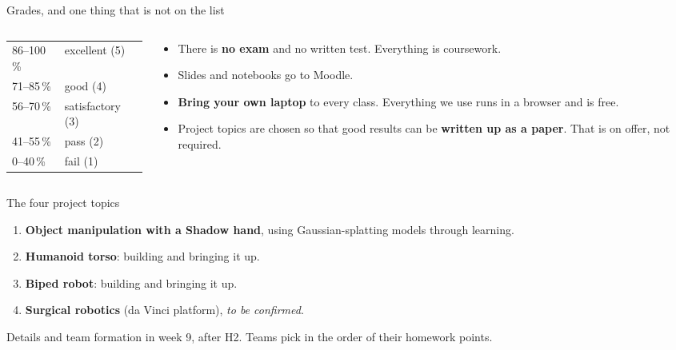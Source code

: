\documentclass[aspectratio=169]{beamer}
\begin{document}
\begin{frame}{Grades, and one thing that is not on the list}
	\begin{columns}[T]
		\begin{column}{0.36\textwidth}
			\centering \small
			\begin{tabular}{ll}
				\toprule
				86--100\,\% & excellent (5) \\
				71--85\,\% & good (4) \\
				56--70\,\% & satisfactory (3) \\
				41--55\,\% & pass (2) \\
				0--40\,\% & fail (1) \\
				\bottomrule
			\end{tabular}
		\end{column}
		\begin{column}{0.6\textwidth}
			\begin{itemize}\footnotesize
				\item There is \textbf{no exam} and no written test. Everything is coursework.
				\item Slides and notebooks go to Moodle.
				\item \textbf{Bring your own laptop} to every class. Everything we use runs in a browser and is free.
				\item Project topics are chosen so that good results can be \textbf{written up as a paper}. That is on offer, not required.
			\end{itemize}
		\end{column}
	\end{columns}
\end{frame}

\begin{frame}{The four project topics}
	\begin{enumerate}
		\item \textbf{Object manipulation with a Shadow hand}, using Gaussian-splatting models through learning.
		\item \textbf{Humanoid torso}: building and bringing it up.
		\item \textbf{Biped robot}: building and bringing it up.
		\item \textbf{Surgical robotics} (da Vinci platform), \emph{to be confirmed}.
	\end{enumerate}
	\vspace{4mm}
	Details and team formation in week 9, after H2. Teams pick in the order of their homework points.
\end{frame}
\end{document}
